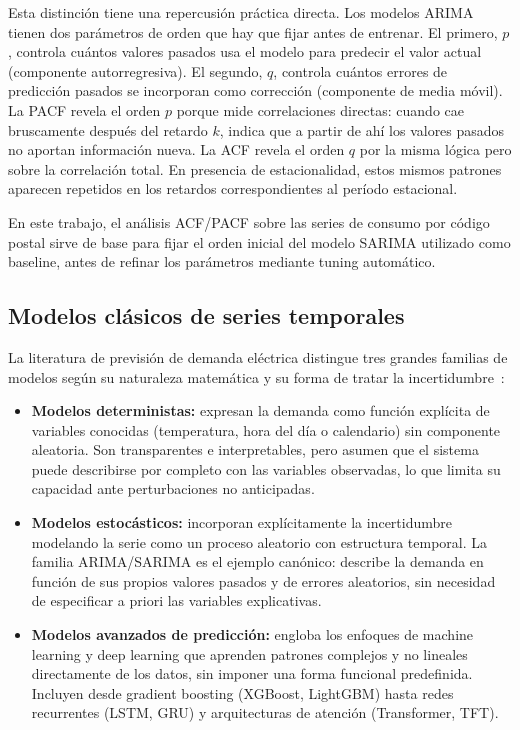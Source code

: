 \documentclass[12pt, a4paper]{article}
\begin{document}
Esta distinción tiene una repercusión práctica directa. Los modelos ARIMA tienen dos parámetros de orden que hay que fijar antes de entrenar. El primero, $p$, controla cuántos valores pasados usa el modelo para predecir el valor actual (componente autorregresiva). El segundo, $q$, controla cuántos errores de predicción pasados se incorporan como corrección (componente de media móvil). La PACF revela el orden $p$ porque mide correlaciones directas: cuando cae bruscamente después del retardo $k$, indica que a partir de ahí los valores pasados no aportan información nueva. La ACF revela el orden $q$ por la misma lógica pero sobre la correlación total. En presencia de estacionalidad, estos mismos patrones aparecen repetidos en los retardos correspondientes al período estacional.

En este trabajo, el análisis ACF/PACF sobre las series de consumo por código postal sirve de base para fijar el orden inicial del modelo SARIMA utilizado como baseline, antes de refinar los parámetros mediante tuning automático.

\subsection{Modelos clásicos de series temporales}

La literatura de previsión de demanda eléctrica distingue tres grandes familias de modelos según su naturaleza matemática y su forma de tratar la incertidumbre~\cite{eke2025}:

\begin{itemize}
    \item \textbf{Modelos deterministas:} expresan la demanda como función explícita de variables conocidas (temperatura, hora del día o calendario) sin componente aleatoria. Son transparentes e interpretables, pero asumen que el sistema puede describirse por completo con las variables observadas, lo que limita su capacidad ante perturbaciones no anticipadas.
    \item \textbf{Modelos estocásticos:} incorporan explícitamente la incertidumbre modelando la serie como un proceso aleatorio con estructura temporal. La familia ARIMA/SARIMA es el ejemplo canónico: describe la demanda en función de sus propios valores pasados y de errores aleatorios, sin necesidad de especificar a priori las variables explicativas.
    \item \textbf{Modelos avanzados de predicción:} engloba los enfoques de machine learning y deep learning que aprenden patrones complejos y no lineales directamente de los datos, sin imponer una forma funcional predefinida. Incluyen desde gradient boosting (XGBoost, LightGBM) hasta redes recurrentes (LSTM, GRU) y arquitecturas de atención (Transformer, TFT).
\end{itemize}
\end{document}
